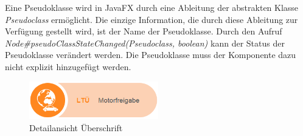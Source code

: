 Eine Pseudoklasse wird in JavaFX durch eine Ableitung der abstrakten Klasse \textit{Pseudoclass} ermöglicht. Die einzige Information, die durch diese Ableitung zur Verfügung gestellt wird, ist der Name der Pseudoklasse. Durch den Aufruf \textit{Node\#{}pseudoClassStateChanged(Pseudoclass, boolean)} kann der Status der Pseudoklasse verändert werden. Die Pseudoklasse muss der Komponente dazu nicht explizit hinzugefügt werden.\par
\begin{figure}[H]
 \centering
 \includegraphics[width=0.5\textwidth]{grafiken/detailPage_bold.png}
 \caption{Detailansicht Überschrift}
 \label{fig:detailPageBold}
\end{figure}
